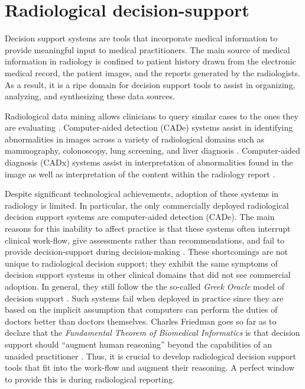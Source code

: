\section{Radiological decision-support}
Decision support systems are tools that incorporate medical information to provide meaningful input to medical practitioners. The main source of medical information in radiology is confined to patient history drawn from the electronic medical record, the patient images, and the reports generated by the radiologists. As a result, it is a ripe domain for decision support tools to assist in organizing, analyzing, and synthesizing these data sources. 

Radiological data mining allows clinicians to query similar cases to the ones they are evaluating \cite{Shin:2015wl,Bozkurt:2014jw,Depeursinge:2012ce,Korenblum:2011gx,Akgul:2011ey,Nassif:2009du}. Computer-aided detection (CADe) systems assist in identifying abnormalities in images across a variety of radiological domains such as mammography, colonoscopy, lung screening, and liver diagnosis \cite{Cheng:2003ig,Castellino:2005ke,Meeuwis:2010bv,Oliver:2010fm,Fenton:2011fw,Fenton:2012kz,Jamieson:2012hz,Gallas:2012eg,Giger:2013jb}. Computer-aided diagnosis (CADx) systems assist in interpretation of abnormalities found in the image \cite{Jiang:1999fj,ElizabethS:2005gc,Gallas:2012eg,Bright:2012ga,Giger:2013jb,Depeursinge:2010jl,Fujita:2008it,Eadie:2011cv,Rubin:2005jg,Garg:2005cb,Elter:2009fv,Jamieson:2010vl,Jamieson:2010tt,Cheng:2003ig,Jiang:2001fy} as well as interpretation of the content within the radiology report \cite{Burnside:2000wl,ElizabethS:2005gc,Burnside:2009br,Rubin:2005jg}.

Despite significant technological achievements, adoption of these systems in radiology is limited. In particular, the only commercially deployed radiological decision support systems are computer-aided detection (CADe). The main reasons for this inability to affect practice is that these systems often interrupt clinical  work-flow, give assessments rather than recommendations, and fail to provide decision-support during decision-making \cite{Kawamoto:2005gn,Morgan:2011ct}. These shortcomings are not unique to radiological decision support; they exhibit the same symptoms of decision support systems in other clinical domains that did not see commercial adoption. In general, they still follow the the so-called \emph{Greek Oracle} model of decision support \cite{Miller:1990wg,Miller:1994cx}. Such systems fail when deployed in practice since they are based on the implicit assumption that computers can perform the duties of doctors better than doctors themselves. Charles Friedman goes so far as to declare that the \emph{Fundamental Theorem of Biomedical Informatics} is that decision support should ``augment human reasoning'' beyond the capabilities of an unaided practitioner \cite{Friedman:2009dx}. Thus, it is crucial to develop radiological decision support tools that fit into the work-flow and augment their reasoning. A perfect window to provide this is during radiological reporting.

